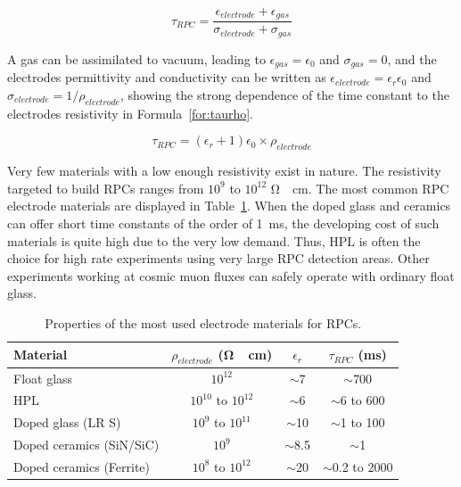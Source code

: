 	\begin{equation}
		\label{for:tau}
		\tau_{RPC} = \frac{\epsilon_{electrode}+\epsilon_{gas}}{\sigma_{electrode}+\sigma_{gas}}
	\end{equation}
	
	A gas can be assimilated to vacuum, leading to $\epsilon_{gas} = \epsilon_0$ and $\sigma_{gas} = 0$, and the electrodes permittivity and conductivity can be written as $\epsilon_{electrode} = \epsilon_r\epsilon_0$ and $\sigma_{electrode} = 1/\rho_{electrode}$, showing the strong dependence of the time constant to the electrodes resistivity in Formula~\ref{for:taurho}.
	
	\begin{equation}
		\label{for:taurho}
		\tau_{RPC} = (\epsilon_r + 1)\epsilon_0\times\rho_{electrode}
	\end{equation}
	
	Very few materials with a low enough resistivity exist in nature. The resistivity targeted to build RPCs ranges from $10^9$ to $10^{12}$ \si{\ohm\cdot cm}. The most common RPC electrode materials are displayed in Table~\ref{tab:tau}. When the doped glass and ceramics can offer short time constants of the order of \SI{1}{ms}, the developing cost of such materials is quite high due to the very low demand. Thus, \acf{HPL} is often the choice for high rate experiments using very large RPC detection areas. Other experiments working at cosmic muon fluxes can safely operate with ordinary float glass.
	
	\begin{table}[H]
		\centering
		\begin{tabular}{|l|c|c|c|}
		\hline
		Material & $\rho_{electrode}$ (\si{\ohm\cdot cm}) & $\epsilon_r$ & $\tau_{RPC}$ (\si{ms})\\
		\hline
		Float glass & $10^{12}$ & $\sim$7 & $\sim$700\\
		\acl{HPL} & $10^{10}$ to $10^{12}$ & $\sim$6 & $\sim$6 to 600\\
		Doped glass (LR S) & $10^{9}$ to $10^{11}$ & $\sim$10 & $\sim$1 to 100\\
		Doped ceramics (SiN/SiC) & $10^{9}$ & $\sim$8.5 & $\sim$1\\
		Doped ceramics (Ferrite) & $10^{8}$ to $10^{12}$ & $\sim$20 & $\sim$0.2 to 2000\\
		\hline
		\end{tabular}
		\caption{\label{tab:tau} Properties of the most used electrode materials for RPCs.}
	\end{table}
	
